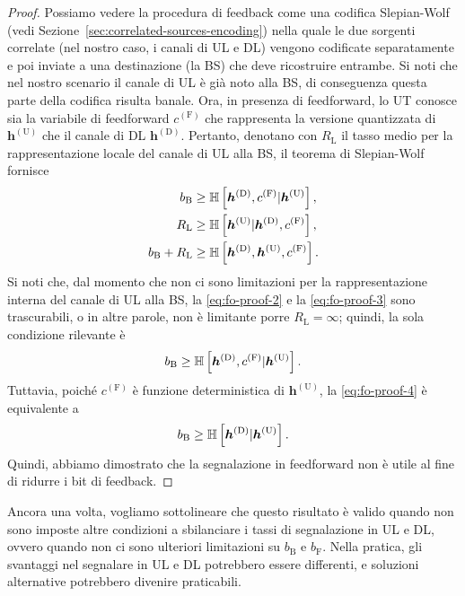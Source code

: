 \begin{proof}
    Possiamo vedere la procedura di feedback come una codifica Slepian-Wolf
    (vedi Sezione~\ref{sec:correlated-sources-encoding}) nella quale le due
    sorgenti correlate (nel nostro caso, i canali di UL e DL) vengono
    codificate separatamente e poi inviate a una destinazione (la BS) che deve
    ricostruire entrambe. Si noti che nel nostro scenario il canale di UL è già
    noto alla BS, di conseguenza questa parte della codifica risulta banale.
    Ora, in presenza di feedforward, lo UT conosce sia la variabile di
    feedforward \(c^\mathrm{(F)}\) che rappresenta la versione quantizzata di
    \(\bm{h}^\mathrm{(U)}\) che il canale di DL \(\bm{h}^\mathrm{(D)}\).
    Pertanto, denotano con \(R_\mathrm{L}\) il tasso medio per la
    rappresentazione locale del canale di UL alla BS, il teorema di
    Slepian-Wolf fornisce
    \begin{alignat}{1}
        b_\mathrm{B} &\ge \mathbb{H}\left[ 
            \bm{h}^\mathrm{(D)},c^\mathrm{(F)} \vert \bm{h}^\mathrm{(U)}
         \right], \label{eq:fo-proof-1} \\
        R_\mathrm{L} &\ge \mathbb{H}\left[ 
            \bm{h}^\mathrm{(U)} \vert \bm{h}^\mathrm{(D)},c^\mathrm{(F)}
         \right], \label{eq:fo-proof-2} \\
        b_\mathrm{B} + R_\mathrm{L} &\ge \mathbb{H}\left[ 
            \bm{h}^\mathrm{(D)},\bm{h}^\mathrm{(U)},c^\mathrm{(F)}
         \right]. \label{eq:fo-proof-3}
    \end{alignat}
    Si noti che, dal momento che non ci sono limitazioni per la
    rappresentazione interna del canale di UL alla BS, la \eqref{eq:fo-proof-2}
    e la \eqref{eq:fo-proof-3} sono trascurabili, o in altre parole, non è
    limitante porre \(R_\mathrm{L} = \infty\); quindi, la sola condizione
    rilevante è
    \begin{equation}
        \label{eq:fo-proof-4}
        b_\mathrm{B} \ge \mathbb{H}\left[ 
            \bm{h}^\mathrm{(D)},c^\mathrm{(F)} \vert \bm{h}^\mathrm{(U)}
         \right].
    \end{equation}
    Tuttavia, poiché \(c^\mathrm{(F)}\) è funzione deterministica di
    \(\bm{h}^\mathrm{(U)}\), la \eqref{eq:fo-proof-4} è equivalente a
    \begin{equation}
        \label{eq:fo-proof-5}
        b_\mathrm{B} \ge \mathbb{H}\left[ 
            \bm{h}^\mathrm{(D)} \vert \bm{h}^\mathrm{(U)}
         \right].
    \end{equation}
    Quindi, abbiamo dimostrato che la segnalazione in feedforward non è utile
    al fine di ridurre i bit di feedback.
\end{proof}

Ancora una volta, vogliamo sottolineare che questo risultato è valido quando
non sono imposte altre condizioni a sbilanciare i tassi di segnalazione in UL e
DL, ovvero quando non ci sono ulteriori limitazioni su \(b_\mathrm{B}\) e
\(b_\mathrm{F}\). Nella pratica, gli svantaggi nel segnalare in UL e DL
potrebbero essere differenti, e soluzioni alternative potrebbero divenire
praticabili.

